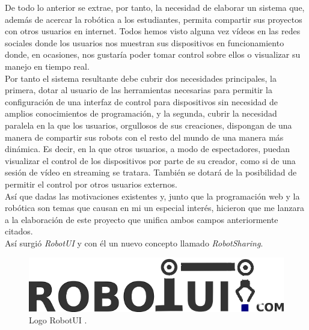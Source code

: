 De todo lo anterior se extrae, por tanto, la necesidad de elaborar un sistema que, además de acercar la robótica a los estudiantes, permita compartir sus proyectos con otros usuarios en internet. Todos hemos
visto alguna vez vídeos en las redes sociales donde los usuarios nos muestran sus dispositivos en funcionamiento donde, en ocasiones, nos gustaría poder tomar control sobre ellos o visualizar su manejo en tiempo real.\\

Por tanto el sistema resultante debe cubrir dos necesidades principales, la primera, dotar al usuario de las herramientas necesarias para permitir la configuración de una interfaz de control para 
dispositivos sin necesidad de amplios conocimientos de programación, y la segunda, cubrir la necesidad paralela en la que los usuarios, orgullosos de sus creaciones, dispongan de una manera de 
compartir sus robots con el resto del mundo de una manera más dinámica. Es decir, en la que otros usuarios, a modo de espectadores, puedan visualizar el control de los dispositivos por parte de 
su creador, como si de una sesión de vídeo en streaming se tratara. También se dotará de la posibilidad de permitir el control por otros usuarios externos.\\

Así que dadas las motivaciones existentes y, junto que la programación web y la robótica son temas que causan en mi un especial interés, hicieron que me lanzara a la elaboración de este
proyecto que unifica ambos campos anteriormente citados.\\

Así surgió \emph{RobotUI} y con él un nuevo concepto llamado \textit{RobotSharing}.\\

\begin{figure}[H]
  \begin{center}
    \includegraphics[scale=0.5]{imagenes/logotipo.png}
  \end{center}
  \label{fig:logo}
 \caption{Logo RobotUI \protect\footnotemark.}
\end{figure}


